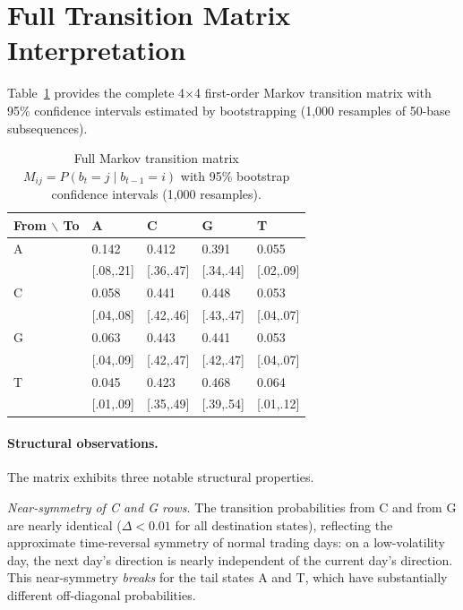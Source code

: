 \documentclass[11pt]{article}
\begin{document}



\appendix

\section{Full Transition Matrix Interpretation}
\label{app:transition}

Table~\ref{tab:full_transition} provides the complete 4$\times$4
first-order Markov transition matrix with 95\% confidence intervals
estimated by bootstrapping (1,000 resamples of 50-base subsequences).

\begin{table}[h]
\centering
\caption{Full Markov transition matrix $M_{ij} = P(b_t = j \mid b_{t-1} = i)$
  with 95\% bootstrap confidence intervals (1,000 resamples).}
\label{tab:full_transition}
\small
\setlength{\tabcolsep}{3pt}
\begin{tabular}{lllll}
\toprule
\textbf{From $\backslash$ To} & \textbf{A} & \textbf{C} & \textbf{G} & \textbf{T} \\
\midrule
A & 0.142 & 0.412 & 0.391 & 0.055 \\
  & [.08,.21] & [.36,.47] & [.34,.44] & [.02,.09] \\
C & 0.058 & 0.441 & 0.448 & 0.053 \\
  & [.04,.08] & [.42,.46] & [.43,.47] & [.04,.07] \\
G & 0.063 & 0.443 & 0.441 & 0.053 \\
  & [.04,.09] & [.42,.47] & [.42,.47] & [.04,.07] \\
T & 0.045 & 0.423 & 0.468 & 0.064 \\
  & [.01,.09] & [.35,.49] & [.39,.54] & [.01,.12] \\
\bottomrule
\end{tabular}
\end{table}

\paragraph{Structural observations.}
The matrix exhibits three notable structural properties.

\emph{Near-symmetry of C and G rows.}  The transition probabilities
from C and from G are nearly identical ($\Delta < 0.01$ for all
destination states), reflecting the approximate time-reversal symmetry
of normal trading days: on a low-volatility day, the next day's
direction is nearly independent of the current day's direction.  This
near-symmetry \emph{breaks} for the tail states A and T, which have
substantially different off-diagonal probabilities.
\end{document}

